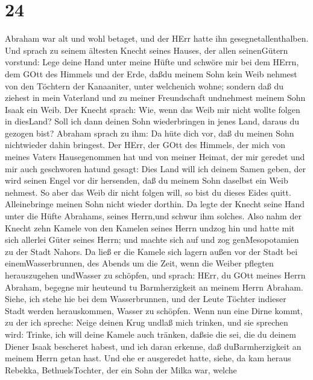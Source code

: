 \hypertarget{section-23}{%
\section{24}\label{section-23}}

 Abraham war alt und wohl betaget, und der HErr hatte ihn
gesegnetallenthalben.  Und sprach zu seinem ältesten Knecht
seines Hauses, der allen seinenGütern vorstund: Lege deine Hand unter
meine Hüfte  und schwöre mir bei dem HErrn, dem GOtt des
Himmels und der Erde, daßdu meinem Sohn kein Weib nehmest von den
Töchtern der Kanaaniter, unter welchenich wohne;  sondern
daß du ziehest in mein Vaterland und zu meiner Freundschaft undnehmest
meinem Sohn Isaak ein Weib.  Der Knecht sprach: Wie, wenn
das Weib mir nicht wollte folgen in diesLand? Soll ich dann deinen Sohn
wiederbringen in jenes Land, daraus du gezogen bist? 
Abraham sprach zu ihm: Da hüte dich vor, daß du meinen Sohn nichtwieder
dahin bringest.  Der HErr, der GOtt des Himmels, der mich
von meines Vaters Hausegenommen hat und von meiner Heimat, der mir
geredet und mir auch geschworen hatund gesagt: Dies Land will ich deinem
Samen geben, der wird seinen Engel vor dir hersenden, daß du meinem Sohn
daselbst ein Weib nehmest.  So aber das Weib dir nicht
folgen will, so bist du dieses Eides quitt. Alleinebringe meinen Sohn
nicht wieder dorthin.  Da legte der Knecht seine Hand unter
die Hüfte Abrahams, seines Herrn,und schwur ihm solches. 
Also nahm der Knecht zehn Kamele von den Kamelen seines Herrn undzog hin
und hatte mit sich allerlei Güter seines Herrn; und machte sich auf und
zog genMesopotamien zu der Stadt Nahors.  Da ließ er die
Kamele sich lagern außen vor der Stadt bei einemWasserbrunnen, des
Abends um die Zeit, wenn die Weiber pflegten herauszugehen undWasser zu
schöpfen,  und sprach: HErr, du GOtt meines Herrn Abraham,
begegne mir heuteund tu Barmherzigkeit an meinem Herrn Abraham.
 Siehe, ich stehe hie bei dem Wasserbrunnen, und der Leute
Töchter indieser Stadt werden herauskommen, Wasser zu schöpfen.
 Wenn nun eine Dirne kommt, zu der ich spreche: Neige
deinen Krug undlaß mich trinken, und sie sprechen wird: Trinke, ich will
deine Kamele auch tränken, daßsie die sei, die du deinem Diener Isaak
bescheret habest, und ich daran erkenne, daß duBarmherzigkeit an meinem
Herrn getan hast.  Und ehe er ausgeredet hatte, siehe, da
kam heraus Rebekka, BethuelsTochter, der ein Sohn der Milka war, welche

